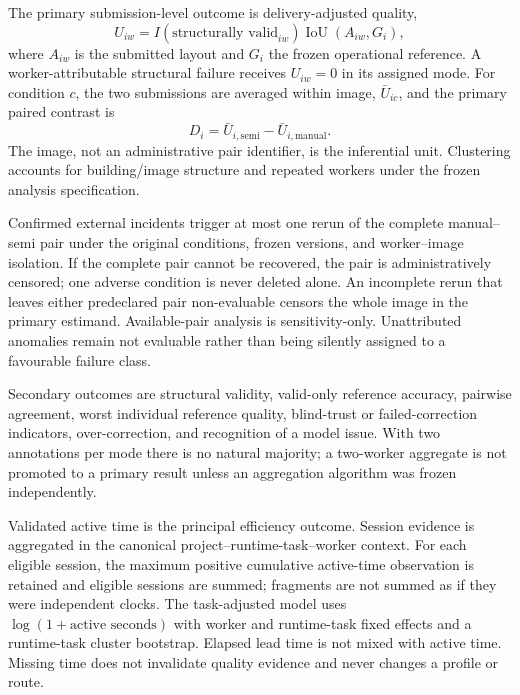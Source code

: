 The primary submission-level outcome is delivery-adjusted quality,
\begin{equation}
 U_{iw}=I(\text{structurally valid}_{iw})
        \operatorname{IoU}(A_{iw},G_i),
 \label{eq:t1utility}
\end{equation}
where $A_{iw}$ is the submitted layout and $G_i$ the frozen operational reference. A worker-attributable structural failure receives $U_{iw}=0$ in its assigned mode. For condition $c$, the two submissions are averaged within image, $\bar U_{ic}$, and the primary paired contrast is
\begin{equation}
 D_i=\bar U_{i,\mathrm{semi}}-\bar U_{i,\mathrm{manual}}.
 \label{eq:t1contrast}
\end{equation}
The image, not an administrative pair identifier, is the inferential unit. Clustering accounts for building/image structure and repeated workers under the frozen analysis specification.

Confirmed external incidents trigger at most one rerun of the complete manual--semi pair under the original conditions, frozen versions, and worker--image isolation. If the complete pair cannot be recovered, the pair is administratively censored; one adverse condition is never deleted alone. An incomplete rerun that leaves either predeclared pair non-evaluable censors the whole image in the primary estimand. Available-pair analysis is sensitivity-only. Unattributed anomalies remain not evaluable rather than being silently assigned to a favourable failure class.

Secondary outcomes are structural validity, valid-only reference accuracy, pairwise agreement, worst individual reference quality, blind-trust or failed-correction indicators, over-correction, and recognition of a model issue. With two annotations per mode there is no natural majority; a two-worker aggregate is not promoted to a primary result unless an aggregation algorithm was frozen independently.

Validated active time is the principal efficiency outcome. Session evidence is aggregated in the canonical project--runtime-task--worker context. For each eligible session, the maximum positive cumulative active-time observation is retained and eligible sessions are summed; fragments are not summed as if they were independent clocks. The task-adjusted model uses $\log(1+\text{active seconds})$ with worker and runtime-task fixed effects and a runtime-task cluster bootstrap. Elapsed lead time is not mixed with active time. Missing time does not invalidate quality evidence and never changes a profile or route.

